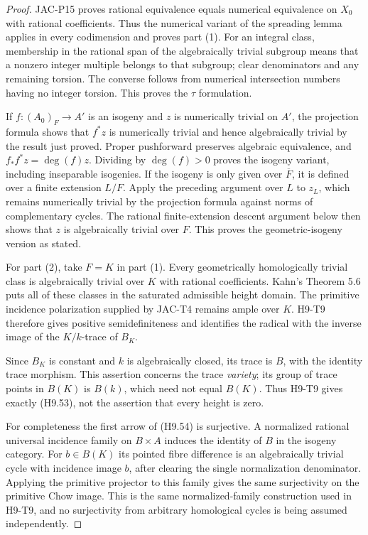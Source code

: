 \begin{proof}
JAC-P15 proves rational equivalence equals numerical equivalence on
$X_0$ with rational coefficients. Thus the numerical variant of the
spreading lemma applies in every codimension and proves part (1).
For an integral class, membership in the rational span of the
algebraically trivial subgroup means that a nonzero integer multiple
belongs to that subgroup; clear denominators and any remaining
torsion. The converse follows from numerical intersection numbers
having no integer torsion. This proves the $\tau$ formulation.

If $f:(A_0)_F\to A'$ is an isogeny and $z$ is numerically trivial
on $A'$, the projection formula shows that $f^*z$ is numerically
trivial and hence algebraically trivial by the result just proved.
Proper pushforward preserves algebraic
equivalence, and $f_*f^*z=\deg(f)z$. Dividing by $\deg(f)>0$
proves the isogeny variant, including inseparable isogenies.
If the isogeny is only given over $\overline F$, it is defined
over a finite extension $L/F$. Apply the preceding argument over
$L$ to $z_L$, which remains numerically trivial by the projection
formula against norms of complementary cycles. The rational
finite-extension descent argument below then shows that $z$ is
algebraically trivial over $F$. This proves the geometric-isogeny
version as stated.

For part (2), take $F=K$ in part (1). Every geometrically
homologically trivial class is algebraically trivial over $K$ with
rational coefficients. Kahn's Theorem 5.6 puts all of these classes
in the saturated admissible height domain. The primitive incidence
polarization supplied by JAC-T4 remains ample over $K$.
H9-T9 therefore gives positive semidefiniteness and identifies the
radical with the inverse image of the $K/k$-trace of $B_K$.

Since $B_K$ is constant and $k$ is algebraically closed, its trace is
$B$, with the identity trace morphism. This assertion concerns the
trace \emph{variety}; its group of trace points in $B(K)$ is
$B(k)$, which need not equal $B(K)$. Thus H9-T9 gives exactly
(H9.53), not the assertion that every height is zero.

For completeness the first arrow of (H9.54) is surjective.
A normalized rational universal incidence family on $B\times A$
induces the identity of $B$ in the isogeny category. For $b\in B(K)$
its pointed fibre difference is an algebraically trivial cycle with
incidence image $b$, after clearing the single normalization
denominator. Applying the primitive projector to this family gives
the same surjectivity on the primitive Chow image. This is the same
normalized-family construction used in H9-T9, and no surjectivity
from arbitrary homological cycles is being assumed independently.


\end{proof}
